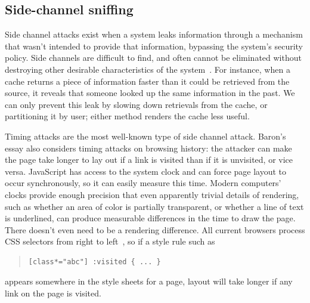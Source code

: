 \documentclass[conference]{IEEEtran}
\begin{document}
\subsection{Side-channel sniffing}\label{sec:sidechannel}

Side channel attacks exist when a system leaks information through a
mechanism that wasn't intended to provide that information, bypassing
the system's security policy.  Side channels are difficult to find,
and often cannot be eliminated without destroying other desirable
characteristics of the system~\cite{rainbow_covert}.  For instance,
when a cache returns a piece of information faster than it could be
retrieved from the source, it reveals that someone looked up the same
information in the past.  We can only prevent this leak by slowing
down retrievals from the cache, or partitioning it by user; either
method renders the cache less useful.

Timing attacks are the most well-known type of side channel attack.
Baron's essay also considers timing attacks on browsing history: the
attacker can make the page take longer to lay out if a link is visited
than if it is unvisited, or vice versa.  JavaScript has access to the
system clock and can force page layout to occur synchronously, so it
can easily measure this time.  Modern computers' clocks provide enough
precision that even apparently trivial details of rendering, such as
whether an area of color is partially transparent, or whether a line
of text is underlined, can produce measurable differences in the time
to draw the page.  There doesn't even need to be a rendering
difference.  All current browsers process CSS selectors from right to
left~\cite{atkins09selmatch}, so if a style rule such as
\begin{quote}\footnotesize
\begin{verbatim}
[class*="abc"] :visited { ... }
\end{verbatim}
\end{quote}
appears somewhere in the style sheets for a page, layout will take
longer if any link on the page is visited.
\end{document}

